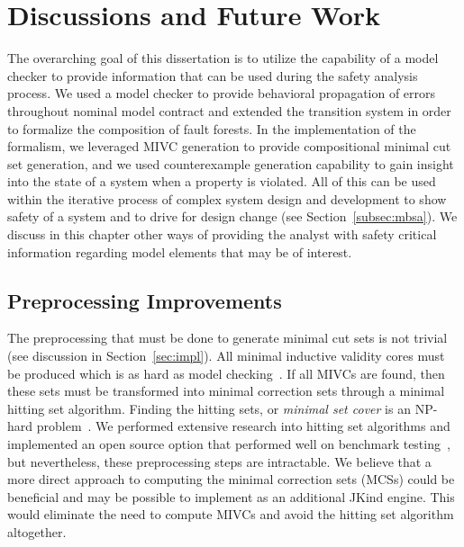 \chapter{Discussions and Future Work}
\label{ch:discussion}
The overarching goal of this dissertation is to utilize the capability of a model checker to provide information that can be used during the safety analysis process. We used a model checker to provide behavioral propagation of errors throughout nominal model contract and extended the transition system in order to formalize the composition of fault forests. In the implementation of the formalism, we leveraged MIVC generation to provide compositional minimal cut set generation, and we used counterexample generation capability to gain insight into the state of a system when a property is violated. All of this can be used within the iterative process of complex system design and development to show safety of a system and to drive for design change (see Section~\ref{subsec:mbsa}). We discuss in this chapter other ways of providing the analyst with safety critical information regarding model elements that may be of interest. 



\section{Preprocessing Improvements}
\label{sec:preproc}
The preprocessing that must be done to generate minimal cut sets is not trivial (see discussion in Section~\ref{sec:impl}). All minimal inductive validity cores must be produced which is as hard as model checking~\cite{GhassabaniGW16}. If all MIVCs are found, then these sets must be transformed into minimal correction sets through a minimal hitting set algorithm. Finding the hitting sets, or {\em minimal set cover} is an NP-hard problem~\cite{gainer2017minimal,karp1972reducibility}.%
We performed extensive research into hitting set algorithms and implemented an open source option that performed well on benchmark testing~\cite{murakami2013efficient}, but nevertheless, these preprocessing steps are intractable. We believe that a more direct approach to computing the minimal correction sets (MCSs) could be beneficial and may be possible to implement as an additional JKind engine. This would eliminate the need to compute MIVCs and avoid the hitting set algorithm altogether. 

